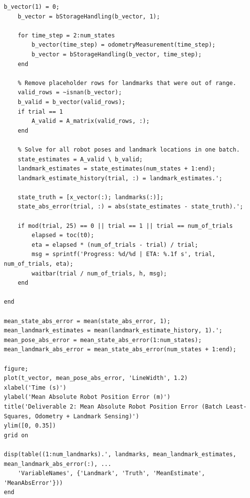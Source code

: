 \documentclass[11pt]{article}
\begin{document}
\begin{lstlisting}[caption={sim2.m}, label={lst:sim2}]
    b_vector(1) = 0;
    b_vector = bStorageHandling(b_vector, 1);

    for time_step = 2:num_states
        b_vector(time_step) = odometryMeasurement(time_step);
        b_vector = bStorageHandling(b_vector, time_step);
    end

    % Remove placeholder rows for landmarks that were out of range.
    valid_rows = ~isnan(b_vector);
    b_valid = b_vector(valid_rows);
    if trial == 1
        A_valid = A_matrix(valid_rows, :);
    end

    % Solve for all robot poses and landmark locations in one batch.
    state_estimates = A_valid \ b_valid;
    landmark_estimates = state_estimates(num_states + 1:end);
    landmark_estimate_history(trial, :) = landmark_estimates.';

    state_truth = [x_vector(:); landmarks(:)];
    state_abs_error(trial, :) = abs(state_estimates - state_truth).';

    if mod(trial, 25) == 0 || trial == 1 || trial == num_of_trials
        elapsed = toc(t0);
        eta = elapsed * (num_of_trials - trial) / trial;
        msg = sprintf('Progress: %d/%d | ETA: %.1f s', trial, num_of_trials, eta);
        waitbar(trial / num_of_trials, h, msg);
    end

end

mean_state_abs_error = mean(state_abs_error, 1);
mean_landmark_estimates = mean(landmark_estimate_history, 1).';
mean_pose_abs_error = mean_state_abs_error(1:num_states);
mean_landmark_abs_error = mean_state_abs_error(num_states + 1:end);

figure;
plot(t_vector, mean_pose_abs_error, 'LineWidth', 1.2)
xlabel('Time (s)')
ylabel('Mean Absolute Robot Position Error (m)')
title('Deliverable 2: Mean Absolute Robot Position Error (Batch Least-Squares, Odometry + Landmark Sensing)')
ylim([0, 0.35])
grid on

disp(table((1:num_landmarks).', landmarks, mean_landmark_estimates, mean_landmark_abs_error(:), ...
    'VariableNames', {'Landmark', 'Truth', 'MeanEstimate', 'MeanAbsError'}))
end
\end{lstlisting}
\end{document}
